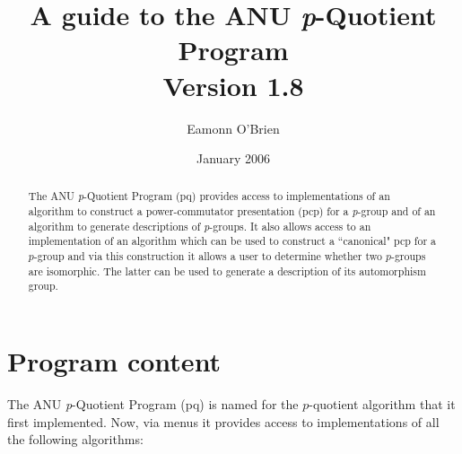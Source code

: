 \documentclass[12pt]{article}
\begin{document}
\title{A guide to the ANU {\it p}-Quotient Program\\Version 1.8}
\author{Eamonn O'Brien}
\date{January 2006}
\maketitle
\tableofcontents
\pagebreak

\begin{abstract}
The ANU {\it p}-Quotient Program (pq) provides access to implementations
of an algorithm to construct a power-commutator presentation (pcp) for 
a {\it p}-group and of an algorithm to generate descriptions of 
{\it p}-groups.  It also allows access to an implementation
of an algorithm which can be used to construct a ``canonical" 
pcp for a $p$-group and via this construction it allows a user 
to determine whether two $p$-groups are isomorphic. The latter
can be used to generate a description of its automorphism group.
\end{abstract}

\section{Program content}\label{sec:prog-content}
The ANU {\it p}-Quotient Program (pq) is named for the $p$-quotient algorithm
that it first implemented. Now, via menus it provides access to implementations
of all the following algorithms:
\end{document}
